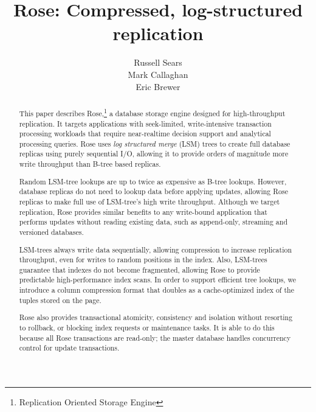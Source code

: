 \documentclass{vldb}
\newcommand{\rows}{Rose\xspace}
\begin{document}
\title{{\ttlit \rows}: Compressed, log-structured replication}
%
%
\author{
\alignauthor
Russell Sears\\
\alignauthor
Mark Callaghan\\
\alignauthor
Eric Brewer\\
}
\maketitle
\begin{abstract}
This paper describes \rows,\footnote{Replication Oriented Storage
  Engine} a database storage engine designed for high-throughput
replication.  It targets applications with seek-limited,
write-intensive transaction processing workloads that require
near-realtime decision support and analytical processing queries.
\rows uses {\em log structured merge} (LSM) trees to create full
database replicas using purely sequential I/O, allowing it to provide
orders of magnitude more write throughput than B-tree based replicas.

Random LSM-tree lookups are up to twice as expensive as
B-tree lookups.  However, database replicas do not need to lookup data before
applying updates, allowing \rows replicas to make full use of LSM-tree's high write throughput.
Although we target replication, \rows provides similar benefits to any
write-bound application that performs updates without reading existing
data, such as append-only, streaming and versioned databases.

LSM-trees always write data sequentially, allowing compression to
increase replication throughput, even for writes to random positions
in the index.  Also, LSM-trees guarantee that indexes do not become
fragmented, allowing \rows to provide predictable high-performance
index scans.  In order to support efficient tree lookups, we introduce
a column compression format that doubles as a cache-optimized index of
the tuples stored on the page.

\rows also provides transactional atomicity, consistency and
isolation without resorting to rollback, or blocking index requests or
maintenance tasks.  It is able to do this because all \rows
transactions are read-only; the master database handles concurrency
control for update transactions.


\end{abstract}
\end{document}
